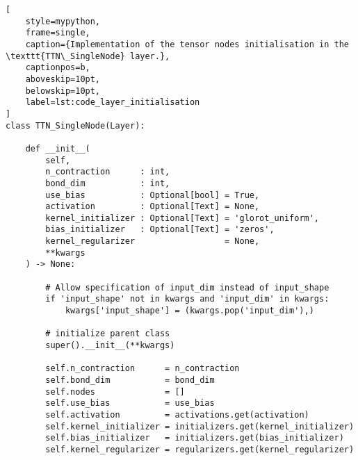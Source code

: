 \documentclass[../main/main.tex]{subfiles}
\begin{document}
\begin{lstlisting}[
    style=mypython,
    frame=single,
    caption={Implementation of the tensor nodes initialisation in the \texttt{TTN\_SingleNode} layer.},
    captionpos=b,
    aboveskip=10pt,
    belowskip=10pt,
    label=lst:code_layer_initialisation
]
class TTN_SingleNode(Layer):

    def __init__(
        self,
        n_contraction      : int,
        bond_dim           : int,
        use_bias           : Optional[bool] = True,
        activation         : Optional[Text] = None,
        kernel_initializer : Optional[Text] = 'glorot_uniform',
        bias_initializer   : Optional[Text] = 'zeros',
        kernel_regularizer                  = None,
        **kwargs
    ) -> None:

        # Allow specification of input_dim instead of input_shape
        if 'input_shape' not in kwargs and 'input_dim' in kwargs:
            kwargs['input_shape'] = (kwargs.pop('input_dim'),)

        # initialize parent class
        super().__init__(**kwargs)

        self.n_contraction      = n_contraction
        self.bond_dim           = bond_dim
        self.nodes              = []
        self.use_bias           = use_bias
        self.activation         = activations.get(activation)
        self.kernel_initializer = initializers.get(kernel_initializer)
        self.bias_initializer   = initializers.get(bias_initializer)
        self.kernel_regularizer = regularizers.get(kernel_regularizer)
\end{lstlisting}





\end{document}
